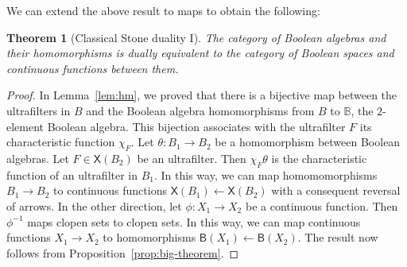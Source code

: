 \documentclass[a4paper]{amsart}
\newtheorem{theorem}{Theorem}[section]
\begin{document}
We can extend the above result to maps to obtain the following:

\begin{theorem}[Classical Stone duality I]\label{them:classical-stone-duality} 
The category of Boolean algebras and their homomorphisms is dually equivalent
to the category of Boolean spaces and continuous functions between them.
\end{theorem}
\begin{proof} In Lemma~\ref{lem:hm}, we proved that there is
a bijective map between the ultrafilters in $B$ and the Boolean algebra homomorphisms from $B$ to $\mathbb{B}$,
the $2$-element Boolean algebra.
This bijection associates with the ultrafilter $F$ its characteristic function $\chi_{F}$.
Let $\theta \colon B_{1} \rightarrow B_{2}$ be a homomorphism between Boolean algebras.
Let $F \in \mathsf{X}(B_{2})$ be an ultrafilter.
Then $\chi_{F} \theta$ is the characteristic function of an ultrafilter in $B_{1}$.
In this way, we can map homomomorphisms $B_{1} \rightarrow B_{2}$ to continuous functions $\mathsf{X}(B_{1}) \leftarrow \mathsf{X}(B_{2})$
with a consequent reversal of arrows.
In the other direction, let $\phi \colon X_{1} \rightarrow X_{2}$ be a continuous function.
Then $\phi^{-1}$ maps clopen sets to clopen sets.
In this way, we can map continuous functions $X_{1} \rightarrow X_{2}$ to homomorphisms $\mathsf{B}(X_{1}) \leftarrow \mathsf{B}(X_{2})$.
The result now follows from Proposition~\ref{prop:big-theorem}.
\end{proof}
\end{document}
